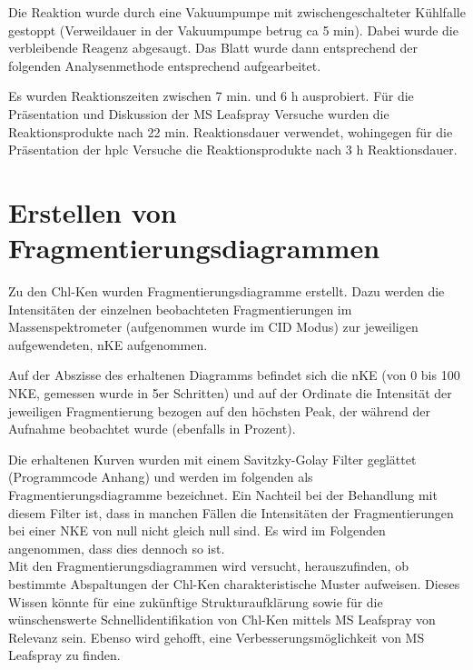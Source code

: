 Die Reaktion wurde durch eine Vakuumpumpe mit zwischengeschalteter Kühlfalle gestoppt (Verweildauer in der Vakuumpumpe betrug \gls{ca} 5 min). Dabei wurde die verbleibende Reagenz abgesaugt. Das Blatt wurde dann entsprechend der folgenden Analysenmethode entsprechend aufgearbeitet.

Es wurden Reaktionszeiten zwischen 7 min. und 6 h ausprobiert. Für die Präsentation und Diskussion der MS Leafspray Versuche wurden die Reaktionsprodukte nach 22 min. Reaktionsdauer verwendet, wohingegen für die Präsentation der \gls{hplc} Versuche die Reaktionsprodukte nach 3 h Reaktionsdauer.

\section{Erstellen von Fragmentierungsdiagrammen} \label{sec:fragmentierungsdiagramme}

Zu den \gls{Chl-K}en wurden Fragmentierungsdiagramme erstellt. Dazu werden die Intensitäten der einzelnen beobachteten Fragmentierungen im Massenspektrometer (aufgenommen wurde im CID Modus) zur jeweiligen aufgewendeten, \gls{nKE} aufgenommen. 

Auf der Abszisse des erhaltenen Diagramms befindet sich die \gls{nKE} (von 0 bis 100 NKE, gemessen wurde in 5er Schritten) und auf der Ordinate die Intensität der jeweiligen Fragmentierung bezogen auf den höchsten Peak, der während der Aufnahme beobachtet wurde (ebenfalls in Prozent). 

Die erhaltenen Kurven wurden mit einem Savitzky-Golay Filter \cite{scipy} geglättet (Programmcode Anhang) und werden im folgenden als Fragmentierungsdiagramme bezeichnet. Ein Nachteil bei der Behandlung mit diesem Filter ist, dass in manchen Fällen die Intensitäten der Fragmentierungen bei einer NKE von null nicht gleich null sind. Es wird im Folgenden angenommen, dass dies dennoch so ist. \\

Mit den Fragmentierungsdiagrammen wird versucht, herauszufinden, ob bestimmte Abspaltungen der \gls{Chl-K}en charakteristische Muster aufweisen. Dieses Wissen könnte für eine zukünftige Strukturaufklärung sowie für die wünschenswerte Schnellidentifikation von \gls{Chl-K}en mittels MS Leafspray von Relevanz sein. Ebenso wird gehofft, eine Verbesserungsmöglichkeit von MS Leafspray zu finden.